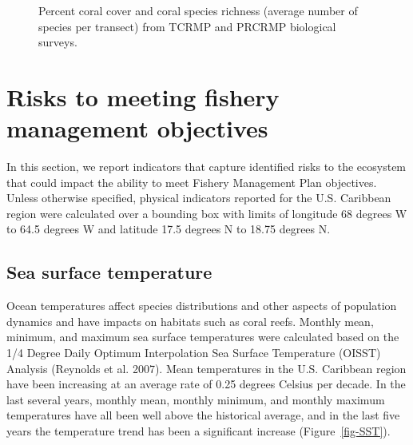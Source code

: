 \documentclass[
  letterpaper,
  oneside,
  open=any]{scrbook}
\begin{document}
\begin{figure}


\caption{\label{fig-coral}Percent coral cover and coral species richness
(average number of species per transect) from TCRMP and PRCRMP
biological surveys.}

\end{figure}%


\chapter{Risks to meeting fishery management
objectives}\label{risks-to-meeting-fishery-management-objectives}

In this section, we report indicators that capture identified risks to
the ecosystem that could impact the ability to meet Fishery Management
Plan objectives. Unless otherwise specified, physical indicators
reported for the U.S. Caribbean region were calculated over a bounding
box with limits of longitude 68 degrees W to 64.5 degrees W and latitude
17.5 degrees N to 18.75 degrees N.

\section{Sea surface temperature}\label{sea-surface-temperature}

Ocean temperatures affect species distributions and other aspects of
population dynamics and have impacts on habitats such as coral reefs.
Monthly mean, minimum, and maximum sea surface temperatures were
calculated based on the 1/4 Degree Daily Optimum Interpolation Sea
Surface Temperature (OISST) Analysis (Reynolds et al. 2007). Mean
temperatures in the U.S. Caribbean region have been increasing at an
average rate of 0.25 degrees Celsius per decade. In the last several
years, monthly mean, monthly minimum, and monthly maximum temperatures
have all been well above the historical average, and in the last five
years the temperature trend has been a significant increase
(Figure~\ref{fig-SST}).
\end{document}
